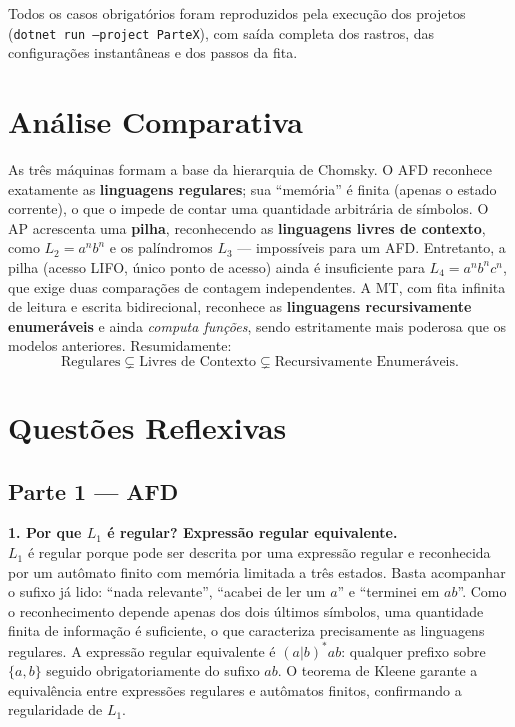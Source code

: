 \documentclass[12pt,a4paper]{article}
\begin{document}
Todos os casos obrigatórios foram reproduzidos pela execução dos projetos
(\texttt{dotnet run --project ParteX}), com saída completa dos rastros, das
configurações instantâneas e dos passos da fita.

\section{Análise Comparativa}
As três máquinas formam a base da hierarquia de Chomsky. O AFD reconhece
exatamente as \textbf{linguagens regulares}; sua ``memória'' é finita (apenas o
estado corrente), o que o impede de contar uma quantidade arbitrária de símbolos.
O AP acrescenta uma \textbf{pilha}, reconhecendo as \textbf{linguagens livres de
contexto}, como $L_2 = a^n b^n$ e os palíndromos $L_3$ --- impossíveis para um
AFD. Entretanto, a pilha (acesso LIFO, único ponto de acesso) ainda é insuficiente
para $L_4 = a^n b^n c^n$, que exige duas comparações de contagem independentes. A
MT, com fita infinita de leitura e escrita bidirecional, reconhece as
\textbf{linguagens recursivamente enumeráveis} e ainda \emph{computa funções},
sendo estritamente mais poderosa que os modelos anteriores. Resumidamente:
\[
\text{Regulares} \subsetneq \text{Livres de Contexto} \subsetneq
\text{Recursivamente Enumeráveis}.
\]

\section{Questões Reflexivas}

\subsection{Parte 1 --- AFD}
\textbf{1. Por que $L_1$ é regular? Expressão regular equivalente.}\\
$L_1$ é regular porque pode ser descrita por uma expressão regular e reconhecida
por um autômato finito com memória limitada a três estados. Basta acompanhar o
sufixo já lido: ``nada relevante'', ``acabei de ler um $a$'' e ``terminei em
$ab$''. Como o reconhecimento depende apenas dos dois últimos símbolos, uma
quantidade finita de informação é suficiente, o que caracteriza precisamente as
linguagens regulares. A expressão regular equivalente é $(a|b)^*ab$: qualquer
prefixo sobre $\{a,b\}$ seguido obrigatoriamente do sufixo $ab$. O teorema de
Kleene garante a equivalência entre expressões regulares e autômatos finitos,
confirmando a regularidade de $L_1$.
\end{document}
